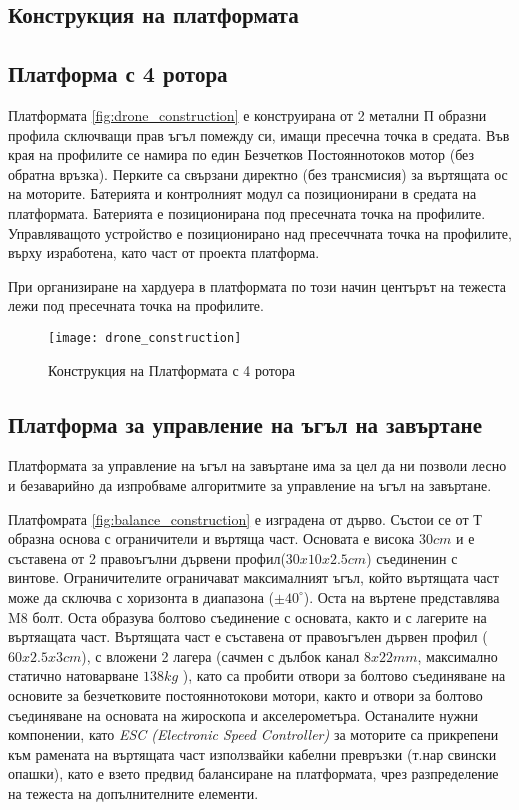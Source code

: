 \subsection{Конструкция на платформата}

\subsection{Платформа с 4 ротора}
\FloatBarrier

Платформата \autoref{fig:drone_construction} е конструирана от 2 метални П образни профила сключващи прав ъгъл помежду си, имащи пресечна точка в средата.
Във края на профилите се намира по един Безчетков Постояннотоков мотор (без обратна връзка).
Перките са свързани директно (без трансмисия) за въртящата ос на моторите.
Батерията и контролният модул са позиционирани в средата на платформата.
Батерията е позиционирана под пресечната точка на профилите.
Управляващото устройство е позиционирано над пресеччната точка на профилите,
върху изработена, като част от проекта платформа.

При организиране на хардуера в платформата по този начин центърът на тежеста лежи под пресечната точка на профилите.


\begin{figure}[htpb!]
    \centering
    \texttt{[image: drone\_construction]}
    \caption{Конструкция на Платформата с 4 ротора}
    \label{fig:drone_construction}
\end{figure}



\FloatBarrier
\subsection{Платформа за управление на ъгъл на завъртане}
\FloatBarrier

Платформата за управление на ъгъл на завъртане има за цел да ни позволи лесно и безаварийно да изпробваме алгоритмите за управление на ъгъл на завъртане.

Платфомрата \autoref{fig:balance_construction} е изградена от дърво.
Състои се от Т образна основа с ограничители и въртяща част.
Основата е висока \(30cm\) и е съставена от 2 правоъгълни дървени профил(\(30x10x2.5cm\)) съединенин с винтове. 
Ограничителите ограничават максималният ъгъл, който въртящата част може да сключва с хоризонта в диапазона (\(\pm 40^{\circ}\)).
Оста на въртене представлява M8 болт.
Оста образува болтово съединение с основата, както и с лагерите на въртяащата част.
Въртящата част е съставена от правоъгълен дървен профил (\(60x2.5x3cm\)), с вложени 2 лагера 
(сачмен с дълбок канал \(8x22mm\), максимално статично натоварване \(138kg\) \cite{datasheet_bearing}),
като са пробити отвори за болтово съединяване на основите за безчетковите постояннотокови мотори,
както и отвори за болтово съединяване на основата на жироскопа и акселерометъра.
Останалите нужни компонении, като \textit{ESC (Electronic Speed Controller)} за моторите са прикрепени към рамената на въртящата
част използвайки кабелни превръзки (т.нар свински опашки), като е взето предвид балансиране на платформата,
чрез разпределение на тежеста на допълнителните елементи.


